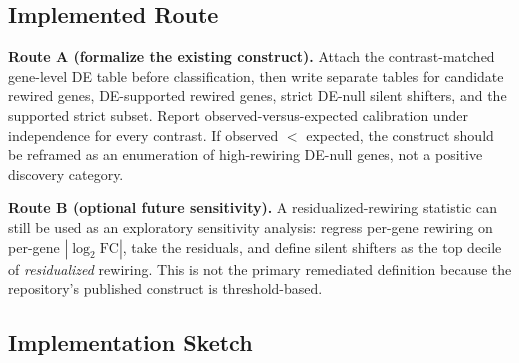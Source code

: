 \documentclass[11pt]{article}
\begin{document}
\subsection{Implemented Route}

\textbf{Route A (formalize the existing construct).} Attach the contrast-matched gene-level DE table before classification, then write separate tables for candidate rewired genes, DE-supported rewired genes, strict DE-null silent shifters, and the supported strict subset. Report observed-versus-expected calibration under independence for every contrast. If observed $<$ expected, the construct should be reframed as an enumeration of high-rewiring DE-null genes, not a positive discovery category.

\textbf{Route B (optional future sensitivity).} A residualized-rewiring statistic can still be used as an exploratory sensitivity analysis: regress per-gene rewiring on per-gene $|\log_2 \mathrm{FC}|$, take the residuals, and define silent shifters as the top decile of \emph{residualized} rewiring. This is not the primary remediated definition because the repository's published construct is threshold-based.

\subsection{Implementation Sketch}
\end{document}
